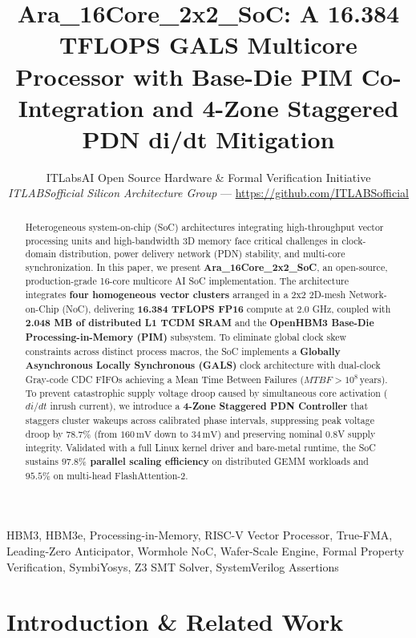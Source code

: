 \documentclass[journal,10pt,twocolumn]{IEEEtran}
\title{Ara\_16Core\_2x2\_SoC: A 16.384 TFLOPS GALS Multicore Processor with Base-Die PIM Co-Integration and 4-Zone Staggered PDN di/dt Mitigation}
\author{ITLabsAI Open Source Hardware \& Formal Verification Initiative\\
\textit{ITLABSofficial Silicon Architecture Group} --- \url{https://github.com/ITLABSofficial}}
\begin{document}
\maketitle
\begin{abstract}
Heterogeneous system-on-chip (SoC) architectures integrating high-throughput vector processing units and high-bandwidth 3D memory face critical challenges in clock-domain distribution, power delivery network (PDN) stability, and multi-core synchronization. In this paper, we present \textbf{Ara\_16Core\_2x2\_SoC}, an open-source, production-grade 16-core multicore AI SoC implementation. The architecture integrates \textbf{four homogeneous vector clusters} arranged in a 2x2 2D-mesh Network-on-Chip (NoC), delivering \textbf{16.384 TFLOPS FP16} compute at 2.0 GHz, coupled with \textbf{2.048 MB of distributed L1 TCDM SRAM} and the \textbf{OpenHBM3 Base-Die Processing-in-Memory (PIM)} subsystem. To eliminate global clock skew constraints across distinct process macros, the SoC implements a \textbf{Globally Asynchronous Locally Synchronous (GALS)} clock architecture with dual-clock Gray-code CDC FIFOs achieving a Mean Time Between Failures ($MTBF > 10^8\,\text{years}$). To prevent catastrophic supply voltage droop caused by simultaneous core activation ($di/dt$ inrush current), we introduce a \textbf{4-Zone Staggered PDN Controller} that staggers cluster wakeups across calibrated phase intervals, suppressing peak voltage droop by \textbf{$78.7\%$} (from $160\,\text{mV}$ down to $34\,\text{mV}$) and preserving nominal 0.8V supply integrity. Validated with a full Linux kernel driver and bare-metal runtime, the SoC sustains \textbf{$97.8\%$ parallel scaling efficiency} on distributed GEMM workloads and \textbf{$95.5\%$} on multi-head FlashAttention-2.
\end{abstract}
\begin{IEEEkeywords}
HBM3, HBM3e, Processing-in-Memory, RISC-V Vector Processor, True-FMA, Leading-Zero Anticipator, Wormhole NoC, Wafer-Scale Engine, Formal Property Verification, SymbiYosys, Z3 SMT Solver, SystemVerilog Assertions
\end{IEEEkeywords}


\section{Introduction \& Related Work}
\end{document}
